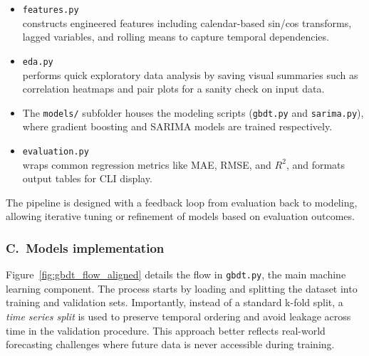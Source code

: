 \begin{itemize}
    \item \texttt{features.py}\\
    constructs engineered features including calendar-based sin/cos transforms, lagged variables, and rolling 
    means to capture temporal dependencies.
    \item \texttt{eda.py}\\
    performs quick exploratory data analysis by saving visual summaries such as correlation heatmaps and pair 
    plots for a sanity check on input data.
    \item The \texttt{models/} subfolder houses the modeling scripts (\texttt{gbdt.py} and \texttt{sarima.py}), 
    where gradient boosting and SARIMA models are trained respectively.
    \item \texttt{evaluation.py}\\
    wraps common regression metrics like MAE, RMSE, and $R^2$, and formats output tables for CLI display.
\end{itemize}

The pipeline is designed with a feedback loop from evaluation back to modeling, allowing iterative tuning or 
refinement of models based on evaluation outcomes.

\subsubsection*{C.\ Models implementation}
Figure~\ref{fig:gbdt_flow_aligned} details the flow in \texttt{gbdt.py}, the main machine learning component. 
The process starts by loading and splitting the dataset into training and validation sets. 
Importantly, instead of a standard k-fold split, a \emph{time series split} is used to preserve temporal ordering 
and avoid leakage across time in the validation procedure. This approach better reflects real-world forecasting 
challenges where future data is never accessible during training.

